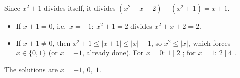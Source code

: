 Since $x^2+1$ divides itself, it divides $(x^2+x+2)-(x^2+1)=x+1$.
\begin{itemize}
\item If $x+1=0$, i.e.\ $x=-1$: $x^2+1=2$ divides $x^2+x+2=2$. \checkmark
\item If $x+1\ne0$, then $x^2+1\le|x+1|\le|x|+1$, so $x^2\le|x|$, which forces $x\in\{0,1\}$ (or $x=-1$, already done). For $x=0$: $1\mid2$ \checkmark; for $x=1$: $2\mid4$ \checkmark.
\end{itemize}
The solutions are $\boxed{x=-1,\ 0,\ 1}$.
